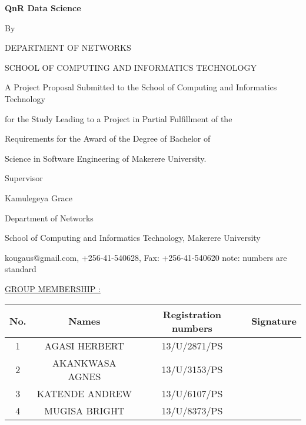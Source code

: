 \documentclass[a4paper,12pt]{article}
\begin{document}
\begin{center}

\textbf{\Large{QnR Data Science}}
\par
\vspace{10mm}
By
\vspace{10mm}
\par
DEPARTMENT OF NETWORKS
\par
SCHOOL OF COMPUTING AND INFORMATICS TECHNOLOGY
\par
\vspace{15mm}
A Project Proposal Submitted to the School of Computing and Informatics Technology 
\par
for the Study Leading to a Project in Partial Fulfillment of the 
\par
Requirements for the Award of the Degree of Bachelor of
\par 
Science in Software Engineering of Makerere University.
\par
\vspace{25mm}
Supervisor
\par
Kamulegeya Grace
\par 
Department of Networks
\par
School of Computing and Informatics Technology, Makerere University
\par
kougaus@gmail.com, +256-41-540628, Fax: +256-41-540620 note: numbers are standard
\par
\date{\today}
\end{center}
\newpage


\underline{GROUP MEMBERSHIP :} 

\begin{table}
\begin{tabular}{ | c | c | c | c | }
  \hline 
	No. & Names & Registration numbers & Signature \\
   \hline
  1 & AGASI HERBERT & 13/U/2871/PS & \\
  \hline
  2 & AKANKWASA AGNES & 13/U/3153/PS & \\
  \hline
  3 & KATENDE ANDREW & 13/U/6107/PS & \\
  \hline
  4 & MUGISA BRIGHT & 13/U/8373/PS & \\
\hline

\end{tabular}
\end{table}

\newpage

\tableofcontents
\newpage

\end{document}
